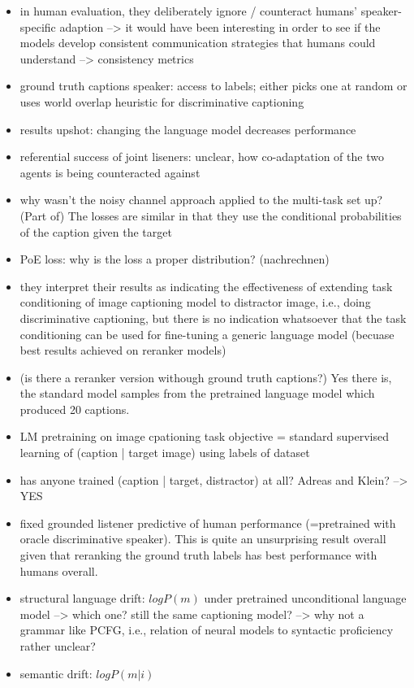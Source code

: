 \documentclass[11pt,letterpaper]{article}
\begin{document}
\begin{itemize}
	\item in human evaluation, they deliberately ignore / counteract humans' speaker-specific adaption --> it would have been interesting in order to see if the models develop consistent communication strategies that humans could understand --> consistency metrics
	\item ground truth captions speaker: access to labels; either picks one at random or uses world overlap heuristic for discriminative captioning
	\item results upshot: changing the language model decreases performance
	\item referential success of joint liseners: unclear, how co-adaptation of the two agents is being counteracted against
	\item why wasn't the noisy channel approach applied to the multi-task set up? (Part of) The losses are similar in that they use the conditional probabilities of the caption given the target
	\item PoE loss: why is the loss a proper distribution? (nachrechnen)
	\item they interpret their results as indicating the effectiveness of extending task conditioning of image captioning model to distractor image, i.e., doing discriminative captioning, but there is no indication whatsoever that the task conditioning can be used for fine-tuning a generic language model (becuase best results achieved on reranker models) 
	\item (is there a reranker version withough ground truth captions?) Yes there is, the standard model samples from the pretrained language model which produced 20 captions. 
	\item LM pretraining on image cpationing task objective = standard supervised learning of (caption | target image) using labels of dataset
	\item has anyone trained (caption | target, distractor) at all? Adreas and Klein? --> YES
	\item fixed grounded listener predictive of human performance (=pretrained with oracle discriminative speaker). This is quite an unsurprising result overall given that reranking the ground truth labels has best performance with humans overall.
	\item structural language drift: $logP(m)$ under pretrained unconditional language model --> which one? still the same captioning model? --> why not a grammar like PCFG, i.e., relation of neural models to syntactic proficiency rather unclear?
	\item semantic drift: $logP(m|i)$

\end{itemize}
\end{document}
